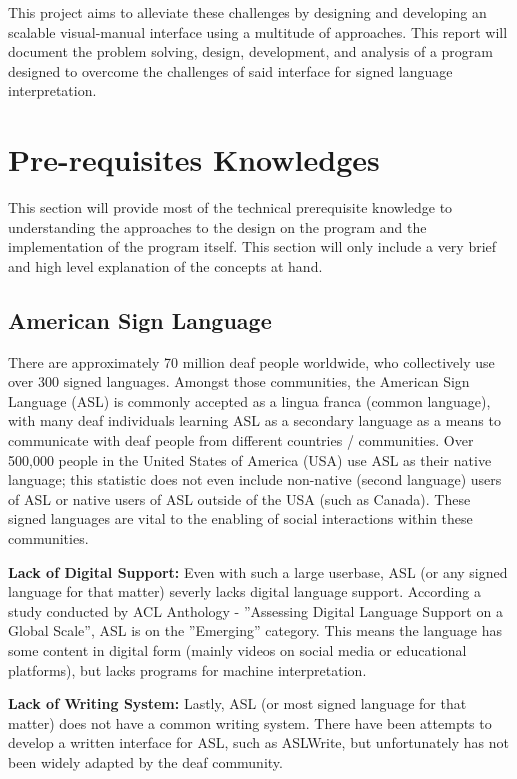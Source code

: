 \documentclass[11pt]{article}
\def\paraskip{\vskip 0.4cm}
\begin{document}
    This project aims to alleviate these challenges by designing and developing an scalable visual-manual interface using a multitude of approaches. This report will document the problem solving, design, development, and analysis of a program designed to overcome the challenges of said interface for signed language interpretation.


\section{Pre-requisites Knowledges}
    This section will provide most of the technical prerequisite knowledge to understanding the approaches to the design on the program and the implementation of the program itself. This section will only include a very brief and high level explanation of the concepts at hand.

    \subsection{American Sign Language}
        There are approximately 70 million deaf people worldwide, who collectively use over 300 signed languages. Amongst those communities, the American Sign Language (ASL) is commonly accepted as a lingua franca (common language), with many deaf individuals learning ASL as a secondary language as a means to communicate with deaf people from different countries / communities. Over 500,000 people in the United States of America (USA) use ASL as their native language; this statistic does not even include non-native (second language) users of ASL or native users of ASL outside of the USA (such as Canada). These signed languages are vital to the enabling of social interactions within these communities. 

        \paraskip

        \noindent\textbf{Lack of Digital Support:} Even with such a large userbase, ASL (or any signed language for that matter) severly lacks digital language support. According a study conducted by ACL Anthology - ”Assessing Digital Language Support on a Global Scale”, ASL is on the ”Emerging” category. This means the language has some content in digital form (mainly videos on social media or educational platforms), but lacks programs for machine interpretation.

        \paraskip

        \noindent\textbf{Lack of Writing System:} Lastly, ASL (or most signed language for that matter) does not have a common writing system. There have been attempts to develop a written interface for ASL, such as ASLWrite, but unfortunately has not been widely adapted by the deaf community.
\end{document}
